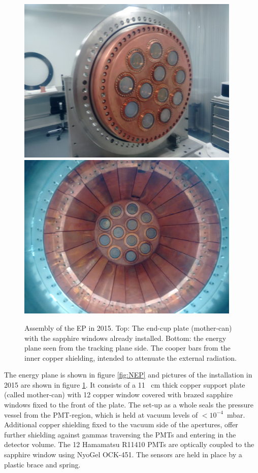 \begin{figure}[hpt!]
\centering
\includegraphics[height=8cm]{img/EP_ENDCUP.png}
\includegraphics[height=8cm]{img/EPI.png}
\caption{Assembly of the EP in 2015. Top: The end-cup plate (mother-can) with the sapphire windows already installed. Bottom: the energy plane seen from the tracking plane side. The cooper bars from the inner copper shielding, intended to attenuate the external radiation. } \label{fig.EPA}
\end{figure}

The energy plane is shown in figure \ref{fig:NEP} and pictures of the installation in 2015 are shown in
figure \ref{fig.EPA}. It 
consists of a 11 ~cm thick copper support plate (called mother-can) with 12 copper window
covered with brazed sapphire windows fixed to the front of the plate. The
set-up as a whole seals the pressure vessel from the PMT-region,
which is held at vacuum levels of
$<10^{-4}$~mbar. Additional copper shielding fixed to the
vacuum side of the apertures, offer further shielding against gammas traversing the PMTs and
entering in the detector volume. The 12 Hamamatsu R11410 PMTs are optically coupled to 
the sapphire window using NyoGel OCK-451. The sensors are held in place by a plastic brace and spring.

